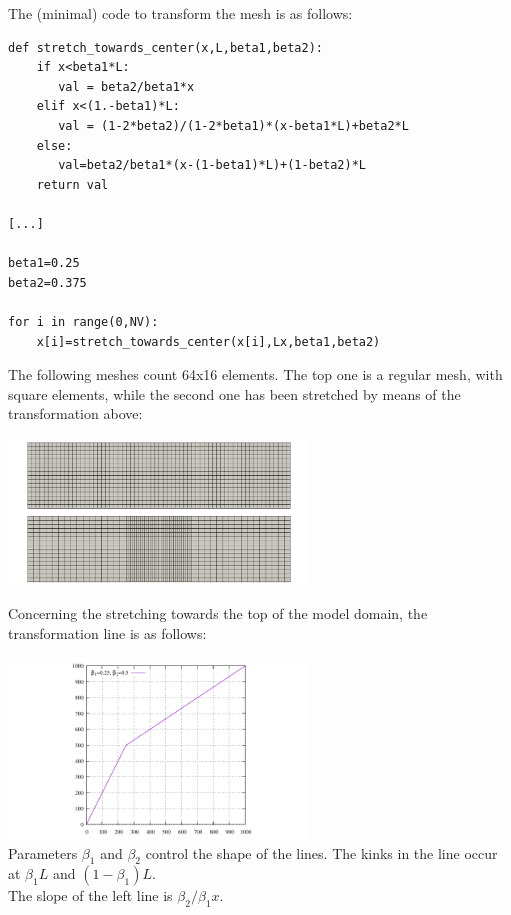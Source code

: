 The (minimal) code to transform the mesh is as follows:
\begin{lstlisting}
def stretch_towards_center(x,L,beta1,beta2):
    if x<beta1*L: 
       val = beta2/beta1*x
    elif x<(1.-beta1)*L: 
       val = (1-2*beta2)/(1-2*beta1)*(x-beta1*L)+beta2*L
    else:
       val=beta2/beta1*(x-(1-beta1)*L)+(1-beta2)*L
    return val

[...]

beta1=0.25
beta2=0.375

for i in range(0,NV):
    x[i]=stretch_towards_center(x[i],Lx,beta1,beta2)
\end{lstlisting}

The following meshes count 64x16 elements. The top one is a regular mesh, with square elements, 
while the second one has been stretched by means of the transformation above:

\begin{center}
\includegraphics[width=8cm]{images/meshes/stretching/stretch_x}
\end{center}

Concerning the stretching towards the top of the model domain, the transformation line is as follows:

\begin{center}
\includegraphics[width=8cm]{images/meshes/stretching/stretch_towards_top}\\
{\captionfont Parameters $\beta_1$ and $\beta_2$ control the shape of the lines. The kinks in the 
line occur at $\beta_1 L$ and $(1-\beta_1)L$.\\ The slope of the left line is $\beta_2/\beta_1 x$.}
\end{center}

